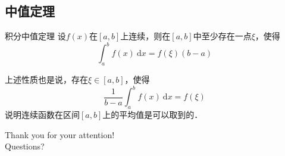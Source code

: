 \documentclass[
10pt,
aspectratio=43,
]{beamer}
\begin{document}
\subsection{中值定理}
\begin{frame}
	\begin{block}{积分中值定理}
	设$f(x)$在$[a,b]$上连续，则在$[a,b]$中至少存在一点$\xi$，使得
	\[ \int_a^b f(x)\mathrm{~d} x = f(\xi)(b-a) \]
	\end{block}
	\begin{block}上述性质也是说，存在$\xi\in[a,b]$，使得
	\[ \frac1{b-a} \int_a^b f(x)\mathrm{~d} x = f(\xi)\]
	说明连续函数在区间$[a,b]$上的平均值是可以取到的．
	\end{block}
	\end{frame}
\begin{frame}[plain]
	\vfill
	\centering
	{
		\centering \Huge \color{white} Thank you for your attention!\\[10pt]Questions?
	}
	\vfill
\end{frame}
\end{document}

